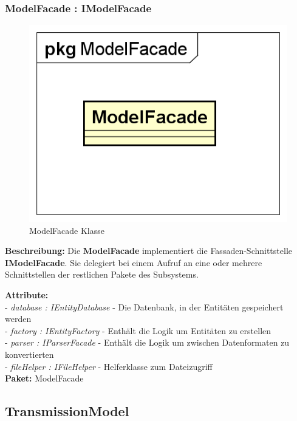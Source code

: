 \documentclass[a4paper]{scrreprt}
\begin{document}
\subsubsection{ModelFacade : IModelFacade}
\begin{figure}[H]
\centering
\includegraphics[width=0.75\textheight]{graphics/Klassendiagramme/Model/ModelFacade.png}
\caption{ModelFacade Klasse}
\end{figure}
\textbf{Beschreibung:} Die \textbf{ModelFacade} implementiert die Fassaden-Schnittstelle \textbf{IModelFacade}. Sie delegiert bei einem Aufruf an eine oder mehrere Schnittstellen der restlichen Pakete des Subsystems.

\textbf{Attribute:}\\
- \textit{database : IEntityDatabase} - Die Datenbank, in der Entitäten gespeichert werden\\
- \textit{factory : IEntityFactory} - Enthält die Logik um Entitäten zu erstellen\\
- \textit{parser : IParserFacade} - Enthält die Logik um zwischen Datenformaten zu konvertierten\\
- \textit{fileHelper : IFileHelper} - Helferklasse zum Dateizugriff\\

\textbf{Paket:} ModelFacade

\subsection{TransmissionModel}
\end{document}
